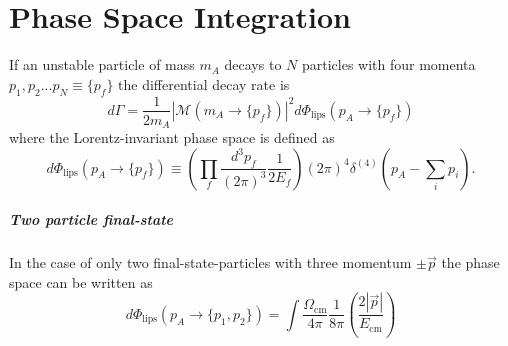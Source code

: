 \chapter{Phase Space Integration}
If an unstable particle of mass $m_A$ decays to $N$ particles with four momenta $p_1,p_2...p_N\equiv\{p_f\}$
the differential decay rate is
\begin{equation}
d\Gamma = \frac{1}{2m_A}|\mathcal{M}(m_A\rightarrow\{p_f\})|^2d\Phi_{\text{lips}}(p_A\rightarrow\{p_f\})
\end{equation}
where the Lorentz-invariant phase space is defined as
\begin{equation}
d\Phi_{\text{lips}}(p_A\rightarrow\{p_f\}) \equiv \left(\prod_f\frac{d^3p_f}{(2\pi)^3}\frac{1}{2E_f}\right)(2\pi)^4\delta^{(4)}\left(p_A-\sum_i p_i\right).
\end{equation}
\paragraph{Two particle final-state}
In the case of only two final-state-particles with three momentum $\pm \vec{p}$ the phase space can be written as
\begin{equation}
d\Phi_{\text{lips}}(p_A\rightarrow\{p_1,p_2\})=\int \frac{\Omega_{\text{cm}}}{4\pi} \frac{1}{8\pi}\left(\frac{2|\vec{p}|}{E_\text{cm}}\right) 
\end{equation}
